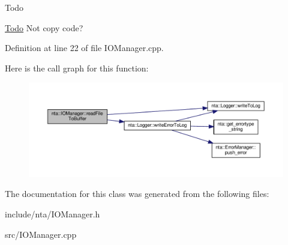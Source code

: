 \begin{DoxyRefDesc}{Todo}
\item[\hyperlink{todo__todo000010}{Todo}]Not copy code? \end{DoxyRefDesc}


Definition at line 22 of file I\+O\+Manager.\+cpp.

Here is the call graph for this function\+:\nopagebreak
\begin{figure}[H]
\begin{center}
\leavevmode
\includegraphics[width=350pt]{d2/d54/classnta_1_1IOManager_abbfd9da05b22aa488043a19344d38e0a_cgraph}
\end{center}
\end{figure}


The documentation for this class was generated from the following files\+:\begin{DoxyCompactItemize}
\item 
include/nta/I\+O\+Manager.\+h\item 
src/I\+O\+Manager.\+cpp\end{DoxyCompactItemize}
